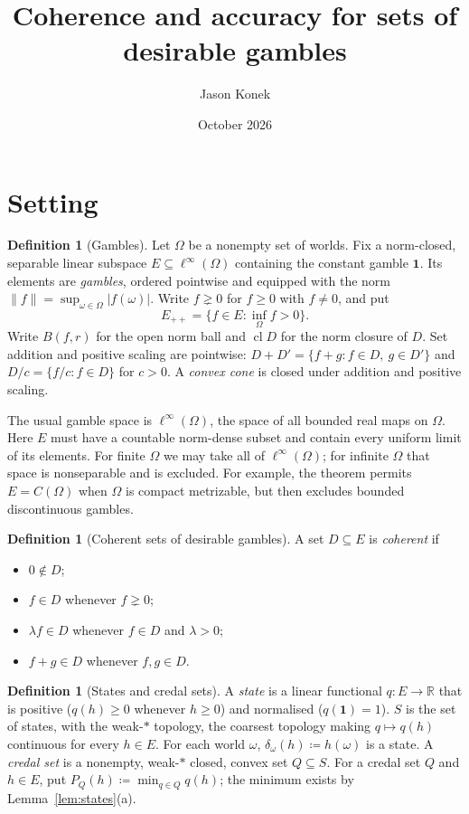 \documentclass[11pt]{article}
\title{Coherence and accuracy for sets of desirable gambles}
\author{Jason Konek}
\date{October 2026}
\theoremstyle{definition}
\newtheorem{definition}[theorem]{Definition}
\newcommand{\R}{\mathbb R}
\newcommand{\one}{\mathbf 1}
\newcommand{\Epp}{E_{++}}
\DeclareMathOperator{\cl}{cl}
\begin{document}
\maketitle

\section{Setting}\label{sec:setting}

\begin{definition}[Gambles]\label{def:gambles}
Let $\Omega$ be a nonempty set of worlds. Fix a norm-closed, separable linear subspace
$E\subseteq\ell^\infty(\Omega)$ containing the constant gamble $\one$. Its elements are
\emph{gambles}, ordered pointwise and equipped with the norm
$\|f\|=\sup_{\omega\in\Omega}|f(\omega)|$. Write $f\gneq0$ for $f\ge0$ with $f\ne0$, and put
\[
  \Epp=\{f\in E:\inf_\Omega f>0\}.
\]
Write $B(f,r)$ for the open norm ball and $\cl D$ for the norm closure of $D$.
Set addition and positive scaling are pointwise: $D+D'=\{f+g:f\in D,\ g\in D'\}$ and
$D/c=\{f/c:f\in D\}$ for $c>0$. A \emph{convex cone} is closed under addition and positive scaling.
\end{definition}

The usual gamble space is $\ell^\infty(\Omega)$, the space of all bounded real maps on
$\Omega$. Here $E$ must have a countable norm-dense subset and contain every uniform limit
of its elements. For finite $\Omega$ we may take all of $\ell^\infty(\Omega)$; for infinite
$\Omega$ that space is nonseparable and is excluded. For example, the theorem permits
$E=C(\Omega)$ when $\Omega$ is compact metrizable, but then excludes bounded discontinuous gambles.

\begin{definition}[Coherent sets of desirable gambles]\label{def:coherence}
A set $D\subseteq E$ is \emph{coherent} if
\begin{itemize}[leftmargin=3em]
\item[(D1)] $0\notin D$;
\item[(D2)] $f\in D$ whenever $f\gneq0$;
\item[(D3)] $\lambda f\in D$ whenever $f\in D$ and $\lambda>0$;
\item[(D4)] $f+g\in D$ whenever $f,g\in D$.
\end{itemize}
\end{definition}

\begin{definition}[States and credal sets]\label{def:states}
A \emph{state} is a linear functional $q:E\to\R$ that is positive ($q(h)\ge0$ whenever $h\ge0$) and normalised ($q(\one)=1$). $S$ is the set of states, with the weak-$\ast$ topology, the coarsest topology making $q\mapsto q(h)$ continuous for every $h\in E$. For each world $\omega$, $\delta_\omega(h)\coloneqq h(\omega)$ is a state. A \emph{credal set} is a nonempty, weak-$\ast$ closed, convex set $Q\subseteq S$. For a credal set $Q$ and $h\in E$, put $P_Q(h)\coloneqq\min_{q\in Q}q(h)$; the minimum exists by Lemma~\ref{lem:states}(a).

\end{definition}
\end{document}
